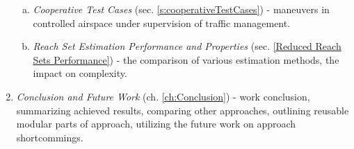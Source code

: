 \begin{enumerate}
\begin{enumerate}[a.]
        \item \emph{Cooperative Test Cases} (sec. \ref{s:cooperativeTestCases}) - maneuvers in controlled airspace under supervision of traffic management.
    
        \item \emph{Reach Set Estimation Performance and Properties} (sec. \ref{Reduced Reach Sets Performance}) - the comparison of various estimation methods, the impact on complexity.
    \end{enumerate}
    
    \item \emph{Conclusion and Future Work} (ch. \ref{ch:Conclusion}) - work conclusion, summarizing achieved results, comparing other approaches, outlining reusable modular parts of approach, utilizing the future work on approach shortcommings.
\end{enumerate}